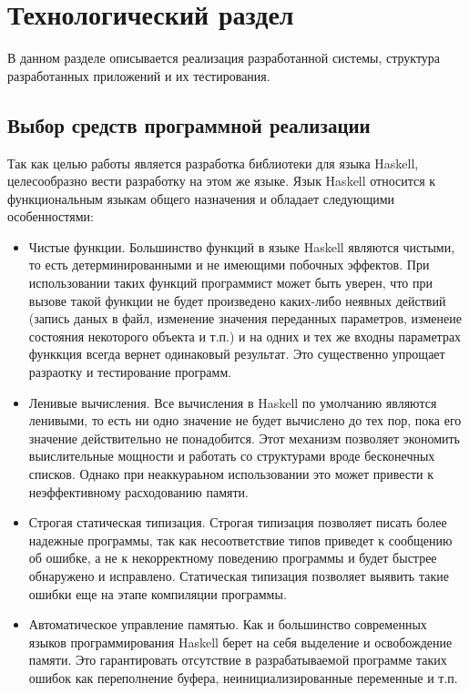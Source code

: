 \chapter{Технологический раздел}

В данном разделе описывается реализация разработанной системы, структура разработанных приложений и их тестирования.

\section{Выбор средств программной реализации}

Так как целью работы является разработка библиотеки для языка Haskell, целесообразно вести разработку на этом же языке. Язык Haskell относится к функциональным языкам общего назначения и обладает следующими особенностями:

\begin{itemize}
\item Чистые функции. Большинство функций в языке Haskell являются чистыми, то есть детерминированными и не имеющими побочных эффектов. При использовании таких функций программист может быть уверен, что при вызове такой функции не будет произведено каких-либо неявных действий (запись даных в файл, изменение значения переданных параметров, изменеие состояния некоторого объекта и т.п.) и на одних и тех же входны параметрах функкция всегда вернет одинаковый результат. Это существенно упрощает разраотку и тестирование программ.

\item Ленивые вычисления. Все вычисления в Haskell по умолчанию являются ленивыми, то есть ни одно значение не будет вычислено до тех пор, пока его значение действительно не понадобится. Этот механизм позволяет экономить выислительные мощности и работать со структурами вроде бесконечных списков. Однако при неаккураьном использовании это может привести к неэффективному расходованию памяти.

\item Строгая статическая типизация. Строгая типизация позволяет писать более надежные программы, так как несоответствие типов приведет к сообщению об ошибке, а не к некорректному поведению программы и будет быстрее обнаружено и исправлено. Статическая типизация позволяет выявить такие ошибки еще на этапе компиляции программы.

\item Автоматическое управление памятью. Как и большинство современных языков программирования Haskell берет на себя выделение и освобождение памяти. Это гарантировать отсутствие в разрабатываемой программе таких ошибок как переполнение буфера, неинициализированные переменные и т.п.

\end{itemize}

